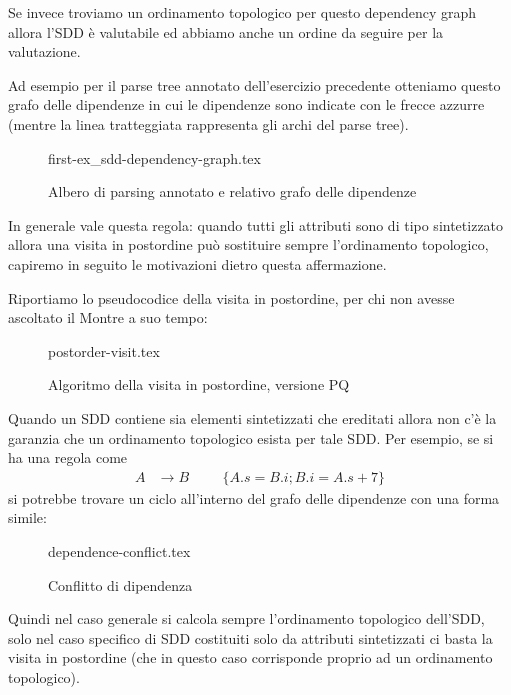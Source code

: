 \documentclass[class=book, crop=false, oneside, 12pt]{standalone}
\begin{document}
\noindent Se invece troviamo un ordinamento topologico per questo dependency graph allora l'SDD è valutabile ed abbiamo anche un ordine da seguire per la valutazione.

Ad esempio per il parse tree annotato dell'esercizio precedente otteniamo questo grafo delle dipendenze in cui le dipendenze sono indicate con le frecce azzurre (mentre la linea tratteggiata rappresenta gli archi del parse tree).
\begin{figure}[H]
    \centering
    {first-ex_sdd-dependency-graph.tex}
    \caption{Albero di parsing annotato e relativo grafo delle dipendenze}
    \label{fig:first-ex_SDD-dependency-graph}
\end{figure}
In generale vale questa regola: quando tutti gli attributi sono di tipo sintetizzato allora una visita in postordine può sostituire sempre l'ordinamento topologico, capiremo in seguito le motivazioni dietro questa affermazione.

Riportiamo lo pseudocodice della visita in postordine, per chi non avesse ascoltato il Montre a suo tempo:
\begin{figure}[H]
    \centering
    {postorder-visit.tex}
    \caption{Algoritmo della visita in postordine, versione PQ}
    \label{fig:postorder-visit}
\end{figure}
Quando un SDD contiene sia elementi sintetizzati che ereditati allora non c'è la garanzia che un ordinamento topologico esista per tale SDD.
Per esempio, se si ha una regola come 
\begin{align*}
    A &\to B & & &\{A.s = B.i; B.i = A.s+7\} 
\end{align*}
si potrebbe trovare un ciclo all'interno del grafo delle dipendenze con una forma simile:
\begin{figure}[H]
    \centering
    {dependence-conflict.tex}
    \caption{Conflitto di dipendenza}
    \label{fig:dependence-conflict}
\end{figure}
Quindi nel caso generale si calcola sempre l'ordinamento topologico dell'SDD, solo nel caso specifico di SDD costituiti solo da attributi sintetizzati ci basta la visita in postordine (che in questo caso corrisponde proprio ad un ordinamento topologico).
\end{document}
